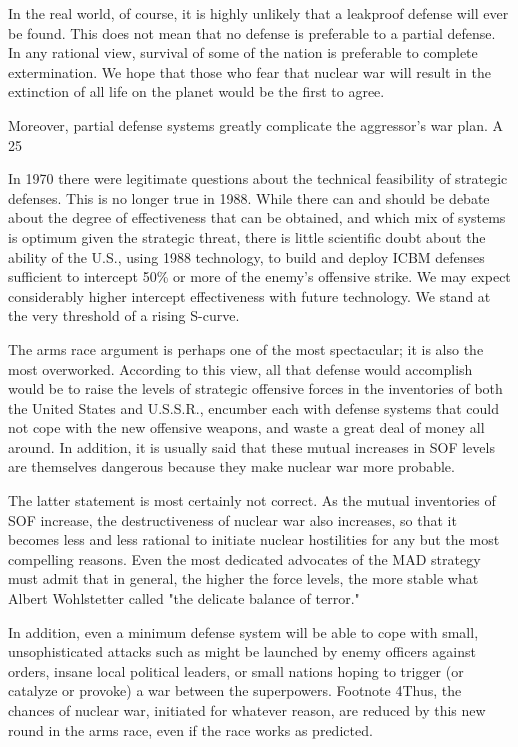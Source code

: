 In the real world, of course, it is highly unlikely that a leakproof defense will ever be found. This does not mean that no defense is preferable to a partial defense. In any rational view, survival of some of the nation is preferable to complete extermination. We hope that those who fear that nuclear war will result in the extinction of all life on the planet would be the first to agree.

Moreover, partial defense systems greatly complicate the aggressor's war plan. A 25%

In 1970 there were legitimate questions about the technical feasibility of strategic defenses. This is no longer true in 1988. While there can and should be debate about the degree of effectiveness that can be obtained, and which mix of systems is optimum given the strategic threat, there is little scientific doubt about the ability of the U.S., using 1988 technology, to build and deploy ICBM defenses sufficient to intercept 50\% or more of the enemy's offensive strike. We may expect considerably higher intercept effectiveness with future technology. We stand at the very threshold of a rising S-curve.

The arms race argument is perhaps one of the most spectacular; it is also the most overworked. According to this view, all that defense would accomplish would be to raise the levels of strategic offensive forces in the inventories of both the United States and U.S.S.R., encumber each with defense systems that could not cope with the new offensive weapons, and waste a great deal of money all around. In addition, it is usually said that these mutual increases in SOF levels are themselves dangerous because they make nuclear war more probable.

The latter statement is most certainly not correct. As the mutual inventories of SOF increase, the destructiveness of nuclear war also increases, so that it becomes less and less rational to initiate nuclear hostilities for any but the most compelling reasons. Even the most dedicated advocates of the MAD strategy must admit that in general, the higher the force levels, the more stable what Albert Wohlstetter called "the delicate balance of terror."

In addition, even a minimum defense system will be able to cope with small, unsophisticated attacks such as might be launched by enemy officers against orders, insane local political leaders, or small nations hoping to trigger (or catalyze or provoke) a war between the superpowers. Footnote 4Thus, the chances of nuclear war, initiated for whatever reason, are reduced by this new round in the arms race, even if the race works as predicted.

